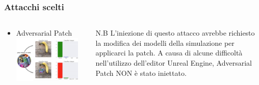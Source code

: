 \documentclass{beamer}
\begin{document}
\begin{frame}
    \frametitle{Attacchi scelti}
    \begin{columns}
        \begin{column}{0.6\textwidth}
            \begin{itemize}
                \item Adversarial Patch\\
                \includegraphics[width =0.9\textwidth]{adversarial_patch.png}
            \end{itemize}  
        \end{column}
    \begin{column}{0.4\textwidth}
        \begin{block}{N.B}
            L'iniezione di questo attacco avrebbe richiesto la modifica dei modelli della simulazione per applicarci la patch. 
            A causa di alcune difficoltà nell'utilizzo dell'editor Unreal Engine, Adversarial Patch NON è stato iniettato.
        \end{block}  
    \end{column}
\end{columns}
\end{frame} 
\end{document}
